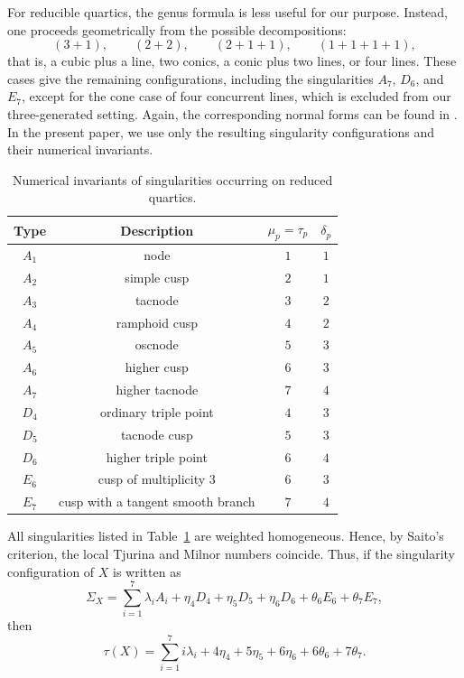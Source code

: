 \documentclass[11pt]{amsart} %
\theoremstyle{definition}
\begin{document}
For reducible quartics, the genus formula is less useful for our purpose. Instead, one proceeds geometrically from the possible decompositions:
\[
(3+1),\qquad (2+2),\qquad (2+1+1),\qquad (1+1+1+1),
\]
that is, a cubic plus a line, two conics, a conic plus two lines, or four lines. These cases give the remaining configurations, including the singularities $A_7$, $D_6$, and $E_7$, except for the cone case of four concurrent lines, which is excluded from our three-generated setting. Again, the corresponding normal forms can be found in \cite{Farrahy-NN}. In the present paper, we use only the resulting singularity configurations and their numerical invariants.

\begin{table}[H]
\caption{Numerical invariants of singularities occurring on reduced quartics.}
\centering
\renewcommand{\arraystretch}{1.15}
\begin{tabular}{|c|c|c|c|}
\hline
Type & Description & $\mu_p=\tau_p$ & $\delta_p$ \\
\hline
$A_1$ & node & $1$ & $1$ \\
$A_2$ & simple cusp & $2$ & $1$ \\
$A_3$ & tacnode & $3$ & $2$ \\
$A_4$ & ramphoid cusp & $4$ & $2$ \\
$A_5$ & oscnode & $5$ & $3$ \\
$A_6$ & higher cusp & $6$ & $3$ \\
$A_7$ & higher tacnode & $7$ & $4$ \\
$D_4$ & ordinary triple point & $4$ & $3$ \\
$D_5$ & tacnode cusp & $5$ & $3$ \\
$D_6$ & higher triple point & $6$ & $4$ \\
$E_6$ & cusp of multiplicity $3$ & $6$ & $3$ \\
$E_7$ & cusp with a tangent smooth branch & $7$ & $4$ \\
\hline
\end{tabular}
\label{tab:quartic-local-invariants}
\end{table}

All singularities listed in Table~\ref{tab:quartic-local-invariants} are weighted homogeneous. Hence, by Saito's criterion, the local Tjurina and Milnor numbers coincide. Thus, if the singularity configuration of $X$ is written as
\[
\Sigma_X=\sum_{i=1}^{7}\lambda_iA_i+\eta_4D_4+\eta_5D_5+\eta_6D_6+\theta_6E_6+\theta_7E_7,
\]
then
\begin{equation}\label{eq:quartic-tjurina-configuration}
\tau(X)=\sum_{i=1}^{7}i\lambda_i+4\eta_4+5\eta_5+6\eta_6+6\theta_6+7\theta_7.
\end{equation}
\end{document}
